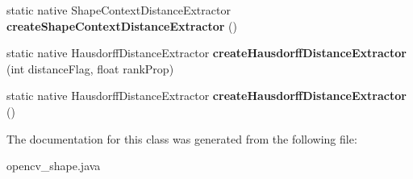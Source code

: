 \begin{DoxyCompactItemize}
\item 
static native Shape\+Context\+Distance\+Extractor {\bfseries create\+Shape\+Context\+Distance\+Extractor} ()
\item 
static native Hausdorff\+Distance\+Extractor {\bfseries create\+Hausdorff\+Distance\+Extractor} (int distance\+Flag, float rank\+Prop)
\item 
static native Hausdorff\+Distance\+Extractor {\bfseries create\+Hausdorff\+Distance\+Extractor} ()
\end{DoxyCompactItemize}


The documentation for this class was generated from the following file\+:\begin{DoxyCompactItemize}
\item 
opencv\+\_\+shape.\+java\end{DoxyCompactItemize}
